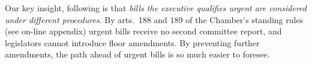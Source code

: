 \documentclass[letter,12pt]{article}
\begin{document}
  
Our key insight, following \citet{sotoCongChile2015} is that \emph{bills the executive qualifies urgent are considered under different procedures}. By arts.~188 and 189 of the Chamber's standing rules (see on-line appendix) urgent bills receive no second committee report, and legislators cannot introduce floor amendments. By preventing further amendments, the path ahead of urgent bills is so much easier to foresee.
\end{document}
